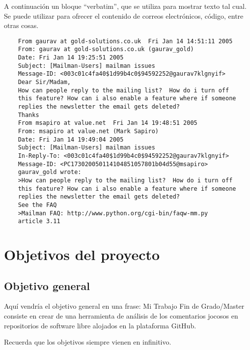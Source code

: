 \documentclass[a4paper, 12pt]{book}
\begin{document}
A continuación un bloque ``verbatim'', que se utiliza para mostrar texto tal cual.
Se puede utilizar para ofrecer el contenido de correos electrónicos, código, entre otras cosas.

{\footnotesize
\begin{verbatim}
    From gaurav at gold-solutions.co.uk  Fri Jan 14 14:51:11 2005
    From: gaurav at gold-solutions.co.uk (gaurav_gold)
    Date: Fri Jan 14 19:25:51 2005
    Subject: [Mailman-Users] mailman issues
    Message-ID: <003c01c4fa40$1d99b4c0$94592252@gaurav7klgnyif>
    Dear Sir/Madam,
    How can people reply to the mailing list?  How do i turn off
    this feature? How can i also enable a feature where if someone
    replies the newsletter the email gets deleted?
    Thanks
    From msapiro at value.net  Fri Jan 14 19:48:51 2005
    From: msapiro at value.net (Mark Sapiro)
    Date: Fri Jan 14 19:49:04 2005
    Subject: [Mailman-Users] mailman issues
    In-Reply-To: <003c01c4fa40$1d99b4c0$94592252@gaurav7klgnyif>
    Message-ID: <PC173020050114104851057801b04d55@msapiro>
    gaurav_gold wrote:
    >How can people reply to the mailing list?  How do i turn off
    this feature? How can i also enable a feature where if someone
    replies the newsletter the email gets deleted?
    See the FAQ
    >Mailman FAQ: http://www.python.org/cgi-bin/faqw-mm.py
    article 3.11
\end{verbatim}
}


\section{Objetivos del proyecto}
\label{sec:objetivos}

\subsection{Objetivo general} %
\label{sec:objetivo-general} %


Aquí vendría el objetivo general en una frase:
Mi Trabajo Fin de Grado/Master consiste en crear de una herramienta de análisis de los comentarios jocosos en repositorios de software libre alojados en la plataforma GitHub.

Recuerda que los objetivos siempre vienen en infinitivo.
\end{document}
